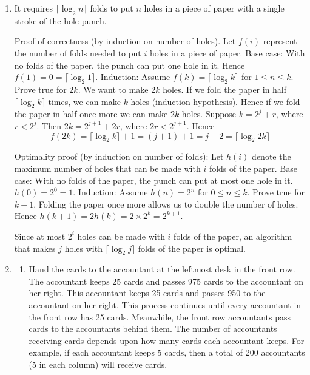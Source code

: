 \begin{enumerate}
\item It requires $\lceil \log_2 n\rceil$ folds to put $n$ holes in a piece
      of paper with a single stroke of the hole punch.

      Proof of correctness (by induction on number of holes).
      Let $f(i)$ represent the number of folds needed to put $i$ holes in
      a piece of paper.
      Base case: With no folds of the paper, the punch can put
      one hole in it. Hence $f(1) = 0 = \lceil\log_2 1\rceil$.
      Induction: Assume $f(k) = \lceil \log_2 k\rceil$ for $1 \le n \le k$.
      Prove true for $2k$.
      We want to make $2k$ holes. If we fold the paper in half
      $\lceil\log_2 k\rceil$
      times, we can make $k$ holes (induction hypothesis). Hence if we fold
      the paper in half once more we can make $2k$ holes. 
      Suppose $k = 2^j + r$, where $r < 2^j$.
      Then $2k = 2^{j+1} + 2r$, where $2r < 2^{j+1}$.
      Hence
      $$f(2k) = \lceil\log_2 k\rceil + 1 = (j + 1) + 1 = j + 2 =
       \lceil\log_2 2k\rceil$$

      Optimality proof (by induction on number of folds):
      Let $h(i)$ denote the maximum number of holes that can be
      made with $i$ folds of the paper.
      Base case: With no folds of the paper, the punch can put at most one
      hole in it. $h(0) = 2^0 = 1$.
      Induction: Assume $h(n) = 2^n$ for
      $0 \le n \le k$. Prove true for $k+1$.
      Folding the paper once more allows us to double the number of holes.
      Hence $h(k+1) = 2h(k) = 2\times 2^k = 2^{k+1}$.

      Since at most $2^i$ holes can be made with $i$ folds of the paper,
      an algorithm that makes $j$ holes with $\lceil\log_2 j\rceil$ folds
      of the paper is optimal.

\item 
\begin{enumerate}
\item Hand the cards to the accountant at the leftmost desk in the front row.
The accountant keeps 25 cards and passes 975 cards to
the accountant on her right. This accountant keeps 25 cards and
passes 950 to the accountant on her right. This process
continues until every accountant in the front row has 25 cards.
Meanwhile, the front row accountants pass cards to the accountants behind them.
The number of accountants receiving cards depends upon how many cards each
accountant keeps.
For example, if each accountant keeps 5 cards, then a total of 200 accountants
(5 in each column) will receive cards.


\end{enumerate}
\end{enumerate}
